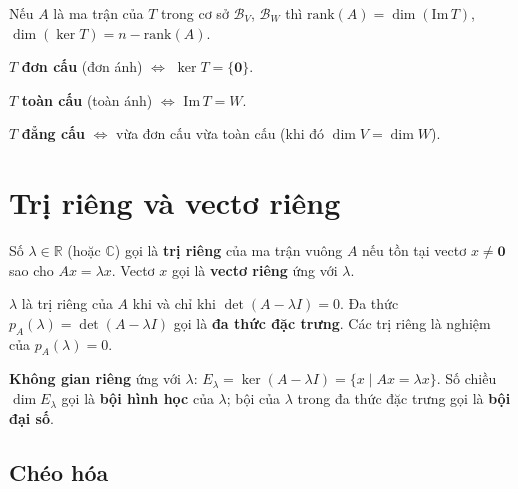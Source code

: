 \documentclass[12pt,a4paper]{article}
\begin{document}
\begin{dinhly}
  Nếu $A$ là ma trận của $T$ trong cơ sở $\mathcal{B}_V$, $\mathcal{B}_W$ thì $\mathrm{rank}(A) = \dim(\mathrm{Im}\,T)$, $\dim(\ker T) = n - \mathrm{rank}(A)$.
\end{dinhly}

\begin{dinhnghia}
  $T$ \textbf{đơn cấu} (đơn ánh) $\Leftrightarrow$ $\ker T = \{\mathbf{0}\}$.
  
  $T$ \textbf{toàn cấu} (toàn ánh) $\Leftrightarrow$ $\mathrm{Im}\,T = W$.
  
  $T$ \textbf{đẳng cấu} $\Leftrightarrow$ vừa đơn cấu vừa toàn cấu (khi đó $\dim V = \dim W$).
\end{dinhnghia}

\section{Trị riêng và vectơ riêng}

\begin{dinhnghia}
  Số $\lambda \in \mathbb{R}$ (hoặc $\mathbb{C}$) gọi là \textbf{trị riêng} của ma trận vuông $A$ nếu tồn tại vectơ $x \ne \mathbf{0}$ sao cho $Ax = \lambda x$. Vectơ $x$ gọi là \textbf{vectơ riêng} ứng với $\lambda$.
\end{dinhnghia}

\begin{congthuc}[title={Phương trình đặc trưng}]
  $\lambda$ là trị riêng của $A$ khi và chỉ khi $\det(A - \lambda I) = 0$. Đa thức $p_A(\lambda) = \det(A - \lambda I)$ gọi là \textbf{đa thức đặc trưng}. Các trị riêng là nghiệm của $p_A(\lambda) = 0$.
\end{congthuc}

\begin{dinhnghia}
  \textbf{Không gian riêng} ứng với $\lambda$: $E_\lambda = \ker(A - \lambda I) = \{x \mid Ax = \lambda x\}$. Số chiều $\dim E_\lambda$ gọi là \textbf{bội hình học} của $\lambda$; bội của $\lambda$ trong đa thức đặc trưng gọi là \textbf{bội đại số}.
\end{dinhnghia}

\subsection{Chéo hóa}
\end{document}
